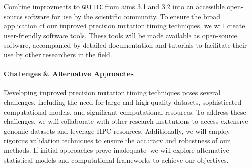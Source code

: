 Combine improvments to \texttt{GRITIC} from aims 3.1 and 3.2 into an accessible 
open-source software for use by the scientific community. 
To ensure the broad application of our improved precision mutation timing techniques, 
we will create user-friendly software tools. 
These tools will be made available as open-source software, 
accompanied by detailed documentation and tutorials to facilitate their use by other researchers in the field.

\paragraph{Challenges \& Alternative Approaches}

Developing improved precision mutation timing techniques poses several challenges, 
including the need for large and high-quality datasets, sophisticated computational models, and significant computational resources.
To address these challenges, we will collaborate with other research institutions to access extensive genomic datasets and leverage HPC resources. 
Additionally, we will employ rigorous validation techniques to ensure the accuracy and robustness of our methods. 
If initial approaches prove inadequate, we will explore alternative statistical models and computational frameworks to achieve our objectives. 


